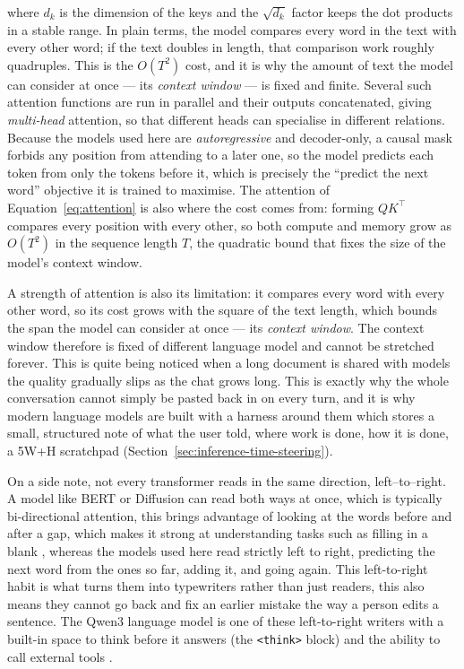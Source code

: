 where $d_k$ is the dimension of the keys and the $\sqrt{d_k}$ factor keeps the dot products in a stable range. In plain terms, the model compares every word in the text with every other word; if the text doubles in length, that comparison work roughly quadruples. This is the $O(T^{2})$ cost, and it is why the amount of text the model can consider at once --- its \emph{context window} --- is fixed and finite. Several such attention functions are run in parallel and their outputs concatenated, giving \emph{multi-head} attention, so that different heads can specialise in different relations. Because the models used here are \emph{autoregressive} and decoder-only, a causal mask forbids any position from attending to a later one, so the model predicts each token from only the tokens before it, which is precisely the ``predict the next word'' objective it is trained to maximise. The attention of Equation~\eqref{eq:attention} is also where the cost comes from: forming $QK^{\top}$ compares every position with every other, so both compute and memory grow as $O(T^{2})$ in the sequence length $T$, the quadratic bound that fixes the size of the model's context window.

A strength of attention is also its limitation: it compares every word with every other word, so its cost grows with the square of the text length, which bounds the span the model can consider at once --- its \emph{context window}. The context window therefore is fixed of different language model and cannot be stretched forever. This is quite being noticed when a long document is shared with models the quality gradually slips as the chat grows long. This is exactly why the whole conversation cannot simply be pasted back in on every turn, and it is why modern language models are built with a harness around them which stores a small, structured note of what the user told, where work is done, how it is done, a 5W+H scratchpad (Section~\ref{sec:inference-time-steering}).

On a side note, not every transformer reads in the same direction, left--to--right. A model like BERT or Diffusion can read both ways at once, which is typically bi-directional attention, this brings advantage of looking at the words before and after a gap, which makes it strong at understanding tasks such as filling in a blank \cite{devlin2019bertpretrainingdeepbidirectional}, whereas the models used here read strictly left to right, predicting the next word from the ones so far, adding it, and going again. This left-to-right habit is what turns them into typewriters rather than just readers, this also means they cannot go back and fix an earlier mistake the way a person edits a sentence. The Qwen3 language model is one of these left-to-right writers with a built-in space to think before it answers (the \texttt{<think>} block) and the ability to call external tools \cite{yang2025qwen3technicalreport}.



